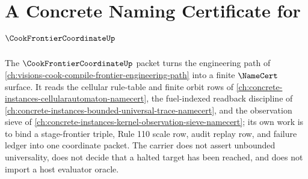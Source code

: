 \chapter{A Concrete Naming Certificate for $\CookFrontierCoordinateUp$}
\label{ch:concrete-instances-cookfrontiercoordinate-namecert}

The $\CookFrontierCoordinateUp$ packet turns the engineering path of \autoref{ch:visions-cook-compile-frontier-engineering-path} into a finite $\NameCert$ surface. It reads the cellular rule-table and finite orbit rows of \autoref{ch:concrete-instances-cellularautomaton-namecert}, the fuel-indexed readback discipline of \autoref{ch:concrete-instances-bounded-universal-trace-namecert}, and the observation sieve of \autoref{ch:concrete-instances-kernel-observation-sieve-namecert}; its own work is to bind a stage-frontier triple, Rule 110 scale row, audit replay row, and failure ledger into one coordinate packet. The carrier does not assert unbounded universality, does not decide that a halted target has been reached, and does not import a host evaluator oracle.



